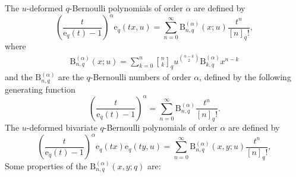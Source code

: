 \documentclass[12pt]{article}
\newcommand{\qbinom}{\genfrac{[}{]}{0pt}{}}
\newcommand{\e}{\mathrm{e}}
\newcommand{\B}{\mathrm{B}}%
\begin{document}
The $u$-deformed $q$-Bernoulli polynomials of order $\alpha$ are defined by
\begin{equation}
    \left(\frac{t}{\e_{q}(t)-1}\right)^{\alpha}\e_{q}(tx,u)=\sum_{n=0}^{\infty}\B_{n,q}^{(\alpha)}(x;u)\frac{t^{n}}{[n]_{q}!},
\end{equation}
where
\begin{align}
        \B_{n,q}^{(\alpha)}(x;u)=\sum_{k=0}^{n}\qbinom{n}{k}_{q}u^{\binom{n-k}{2}}\B_{k,q}^{(\alpha)}x^{n-k}
\end{align}
and the $\B_{n,q}^{(\alpha)}$ are the $q$-Bernoulli numbers of order $\alpha$, defined by the following generating function
\begin{equation}\label{eqn_qBerNum}
        \left(\frac{t}{\e_{q}(t)-1}\right)^{\alpha}=\sum_{n=0}^{\infty}\B_{n,q}^{(\alpha)}\frac{t^n}{[n]_{q}!}.
    \end{equation}    
The $u$-deformed bivariate $q$-Bernoulli polynomials of order $\alpha$ are defined by
\begin{equation}
    \left(\frac{t}{\e_{q}(t)-1}\right)^{\alpha}\e_{q}(tx)\e_{q}(ty,u)=\sum_{n=0}^{\infty}\B_{n,q}^{(\alpha)}(x,y;u)\frac{t^{n}}{[n]_{q}!},
\end{equation}
Some properties of the $\B_{n,q}^{(\alpha)}(x,y;q)$ are:
\end{document}
